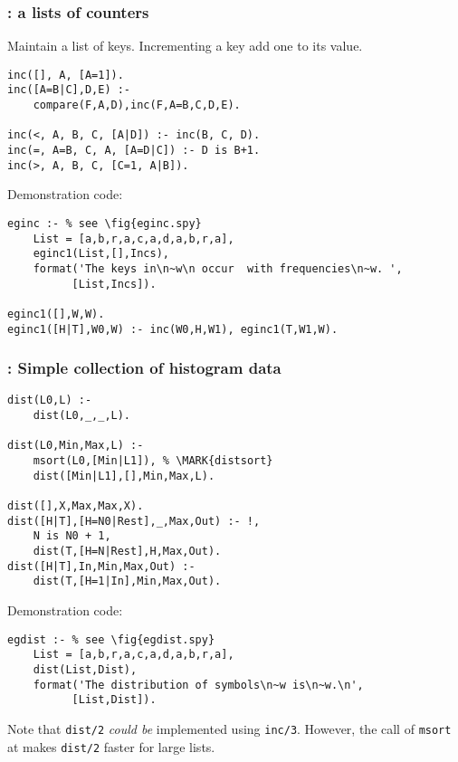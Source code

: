 \subsubsection{ : a lists of counters 
}
\label{sec:inc/3}
Maintain a list of keys. Incrementing a key 
add one to its value.
\begin{Verbatim}
inc([], A, [A=1]).
inc([A=B|C],D,E) :- 
    compare(F,A,D),inc(F,A=B,C,D,E).

inc(<, A, B, C, [A|D]) :- inc(B, C, D).
inc(=, A=B, C, A, [A=D|C]) :- D is B+1.
inc(>, A, B, C, [C=1, A|B]).
\end{Verbatim}
 Demonstration code:
\begin{Verbatim}
eginc :- % see \fig{eginc.spy}
    List = [a,b,r,a,c,a,d,a,b,r,a],
    eginc1(List,[],Incs),
    format('The keys in\n~w\n occur  with frequencies\n~w. ',
          [List,Incs]).
    
eginc1([],W,W).
eginc1([H|T],W0,W) :- inc(W0,H,W1), eginc1(T,W1,W).
\end{Verbatim}
\subsubsection{ : Simple collection of histogram data 
}
\label{sec:dist/2}
\begin{Verbatim}
dist(L0,L) :- 
    dist(L0,_,_,L).

dist(L0,Min,Max,L) :-
    msort(L0,[Min|L1]), % \MARK{distsort}
    dist([Min|L1],[],Min,Max,L).

dist([],X,Max,Max,X).
dist([H|T],[H=N0|Rest],_,Max,Out) :- !,
    N is N0 + 1,
    dist(T,[H=N|Rest],H,Max,Out).
dist([H|T],In,Min,Max,Out) :-
    dist(T,[H=1|In],Min,Max,Out).
\end{Verbatim}
 Demonstration code: 
\begin{Verbatim}
egdist :- % see \fig{egdist.spy}
    List = [a,b,r,a,c,a,d,a,b,r,a],
    dist(List,Dist),
    format('The distribution of symbols\n~w is\n~w.\n',
          [List,Dist]).
\end{Verbatim}
Note that {\tt dist/2} {\em could be} implemented
using {\tt inc/3}. However, the call of {\tt msort} at 
makes  {\tt dist/2} faster for large lists.
